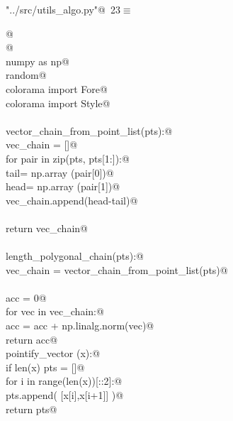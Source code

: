 \documentclass[12.0pt]{report}
\begin{document}
\begin{appendices}
\begin{flushleft} \small\label{scrap10}\raggedright\small
{} \verb@"../src/utils_algo.py"@\nobreak\ {\footnotesize {23}}$\equiv$
\vspace{-1ex}
\begin{list}{}{} \item
\mbox{}\verb@    @\\
\mbox{}\verb@ @\\
\mbox{}\verb@import numpy as np@\\
\mbox{}\verb@import random@\\
\mbox{}\verb@from colorama import Fore@\\
\mbox{}\verb@from colorama import Style@\\
\mbox{}\verb@@\\
\mbox{}\verb@def vector_chain_from_point_list(pts):@\\
\mbox{}\verb@    vec_chain = []@\\
\mbox{}\verb@    for pair in zip(pts, pts[1:]):@\\
\mbox{}\verb@        tail= np.array (pair[0])@\\
\mbox{}\verb@        head= np.array (pair[1])@\\
\mbox{}\verb@        vec_chain.append(head-tail)@\\
\mbox{}\verb@@\\
\mbox{}\verb@    return vec_chain@\\
\mbox{}\verb@@\\
\mbox{}\verb@def length_polygonal_chain(pts):@\\
\mbox{}\verb@    vec_chain = vector_chain_from_point_list(pts)@\\
\mbox{}\verb@@\\
\mbox{}\verb@    acc = 0@\\
\mbox{}\verb@    for vec in vec_chain:@\\
\mbox{}\verb@        acc = acc + np.linalg.norm(vec)@\\
\mbox{}\verb@    return acc@\\
\mbox{}\verb@def pointify_vector (x):@\\
\mbox{}\verb@    if len(x) % 2 == 0:@\\
\mbox{}\verb@        pts = []@\\
\mbox{}\verb@        for i in range(len(x))[::2]:@\\
\mbox{}\verb@            pts.append( [x[i],x[i+1]] )@\\
\mbox{}\verb@        return pts@\\

\end{list}
\end{flushleft}
\end{appendices}
\end{document}
